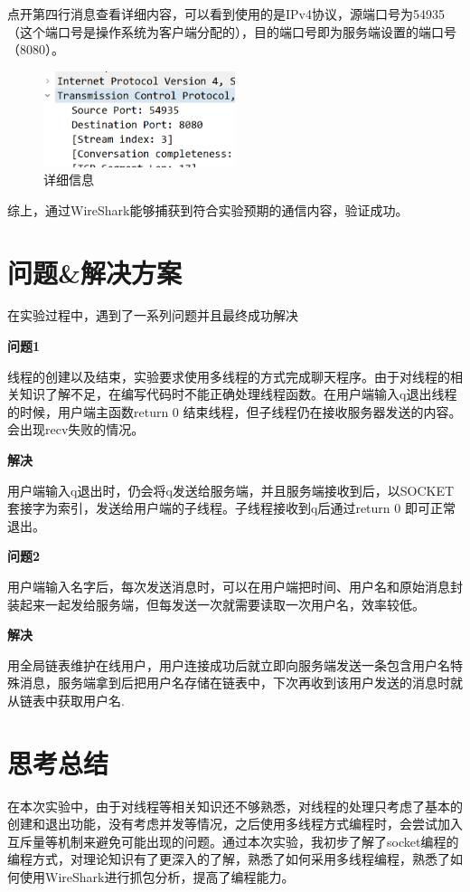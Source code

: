 \documentclass[UTF8,a4paper,10pt]{ctexart}
\begin{document}
点开第四行消息查看详细内容，可以看到使用的是IPv4协议，源端口号为54935（这个端口号是操作系统为客户端分配的），目的端口号即为服务端设置的端口号（8080）。
\begin{figure}[H]
    \centering
\includegraphics[width=0.5\textwidth]{img/详细信息.png}
    \caption{详细信息}
\end{figure}\par
综上，通过WireShark能够捕获到符合实验预期的通信内容，验证成功。

\section{问题\&解决方案}
在实验过程中，遇到了一系列问题并且最终成功解决\par
\vspace{0.5cm}

 \textbf{问题1}\par
线程的创建以及结束，实验要求使用多线程的方式完成聊天程序。由于对线程的相关知识了解不足，在编写代码时不能正确处理线程函数。在用户端输入q退出线程的时候，用户端主函数return 0 结束线程，但子线程仍在接收服务器发送的内容。会出现recv失败的情况。\par
\vspace{0.2cm}
\textbf{解决}\par
用户端输入q退出时，仍会将q发送给服务端，并且服务端接收到后，以SOCKET套接字为索引，发送给用户端的子线程。子线程接收到q后通过return 0 即可正常退出。

\vspace{0.5cm}
\textbf{问题2}\par
用户端输入名字后，每次发送消息时，可以在用户端把时间、用户名和原始消息封装起来一起发给服务端，但每发送一次就需要读取一次用户名，效率较低。\par
\vspace{0.2cm}
\textbf{解决}\par
用全局链表维护在线用户，用户连接成功后就立即向服务端发送一条包含用户名特殊消息，服务端拿到后把用户名存储在链表中，下次再收到该用户发送的消息时就从链表中获取用户名.


\section{思考总结}
在本次实验中，由于对线程等相关知识还不够熟悉，对线程的处理只考虑了基本的创建和退出功能，没有考虑并发等情况，之后使用多线程方式编程时，会尝试加入互斥量等机制来避免可能出现的问题。通过本次实验，我初步了解了socket编程的编程方式，对理论知识有了更深入的了解，熟悉了如何采用多线程编程，熟悉了如何使用WireShark进行抓包分析，提高了编程能力。
\vspace{0.5cm}
\end{document}
